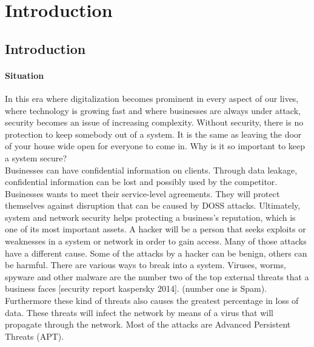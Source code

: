 \chapter{Introduction}
\label{cha:10}
%


\section{Introduction}



\subsubsection{Situation}
In this era where digitalization becomes prominent in every aspect of our lives, where technology is growing fast and where businesses are always under attack, security becomes an issue of increasing complexity. Without security, there is no protection to keep somebody out of a system. It is the same as leaving the door of your house wide open for everyone to come in. Why is it so important to keep a system secure?  \\

Businesses can have confidential information on clients. Through data leakage, confidential information can be lost and possibly used by the competitor. Businesses wants to meet their service-level agreements. They will protect themselves against disruption that can be caused by DOSS attacks. Ultimately, system and network security helps protecting a business's reputation, which is one of its most important assets. %
 A hacker will be a person that seeks exploits or weaknesses in a system or network in order to gain access.  Many of those attacks have a different cause. Some of the attacks by a hacker can be benign, others can be harmful. There are various ways to break into a system. Viruses, worms, spyware and other malware are the number two of the top external threats that a business faces [security report kaspersky 2014]. (number one is Spam). Furthermore these kind of threats also causes the greatest percentage in loss of data. These threats will infect the network by means of a virus that will propagate through the network. Most of the attacks are Advanced Persistent Threats (APT).\\


